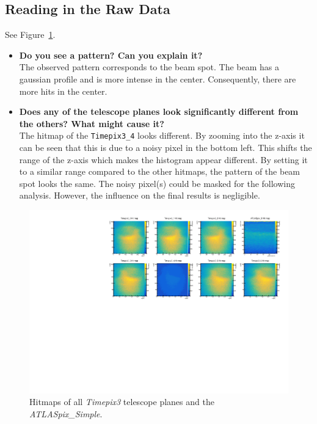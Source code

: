 \documentclass[a4paper,11pt]{article}
\newcommand*{\apx}{\emph{ATLASpix\_Simple}\xspace}
\newcommand*{\tpx}{\emph{Timepix3}\xspace}
\newcommand*{\code}[1]{\texttt{#1}}
\begin{document}
\subsection{Reading in the Raw Data}
See Figure~\ref{fig:02_hitmaps}.
\begin{itemize}
\item \textbf{Do you see a pattern? Can you explain it?}\\
The observed pattern corresponds to the beam spot.
The beam has a gaussian profile and is more intense in the center.
Consequently, there are more hits in the center.
\item \textbf{Does any of the telescope planes look significantly different from the others? What might cause it?}\\
The hitmap of the \code{Timepix3\_4} looks different.
By zooming into the z-axis it can be seen that this is due to a noisy pixel in the bottom left.
This shifts the range of the z-axis which makes the histogram appear different.
By setting it to a similar range compared to the other hitmaps, the pattern of the beam spot looks the same.
The noisy pixel(s) could be masked for the following analysis.
However, the influence on the final results is negligible.
\end{itemize}

\begin{figure}[!htb]
\centering
\includegraphics[width=\textwidth]{02_read_data_hitmaps}
\caption{Hitmaps of all \tpx telescope planes and the \apx.}
\label{fig:02_hitmaps}
\end{figure}
\end{document}
